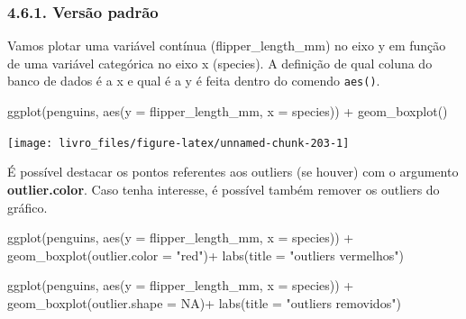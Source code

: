 \documentclass[
]{book}
\newenvironment{Shaded}{\begin{snugshade}}{\end{snugshade}}
\newcommand{\AttributeTok}[1]{\textcolor[rgb]{0.61,0.61,0.61}{#1}}
\newcommand{\ConstantTok}[1]{\textcolor[rgb]{0,0,0}{#1}}
\newcommand{\FunctionTok}[1]{\textcolor[rgb]{0,0,0}{#1}}
\newcommand{\NormalTok}[1]{#1}
\newcommand{\SpecialCharTok}[1]{\textcolor[rgb]{0,0,0}{#1}}
\newcommand{\StringTok}[1]{\textcolor[rgb]{0.5,0.5,0.5}{#1}}
\begin{document}
\hypertarget{versuxe3o-padruxe3o-4}{%
\subsubsection{4.6.1. Versão padrão}\label{versuxe3o-padruxe3o-4}}

Vamos plotar uma variável contínua (flipper\_length\_mm) no eixo y em função de uma variável categórica no eixo x (species). A definição de qual coluna do banco de dados é a x e qual é a y é feita dentro do comendo \texttt{aes()}.

\begin{Shaded}
\begin{Highlighting}[]

\FunctionTok{ggplot}\NormalTok{(penguins, }\FunctionTok{aes}\NormalTok{(}\AttributeTok{y =}\NormalTok{ flipper\_length\_mm, }\AttributeTok{x =}\NormalTok{ species)) }\SpecialCharTok{+}
  \FunctionTok{geom\_boxplot}\NormalTok{()}
\end{Highlighting}
\end{Shaded}

\begin{center}\texttt{[image: livro\_files/figure-latex/unnamed-chunk-203-1]} \end{center}

É possível destacar os pontos referentes aos outliers (se houver) com o argumento \textbf{outlier.color}. Caso tenha interesse, é possível também remover os outliers do gráfico.

\begin{Shaded}
\begin{Highlighting}[]

\FunctionTok{ggplot}\NormalTok{(penguins, }\FunctionTok{aes}\NormalTok{(}\AttributeTok{y =}\NormalTok{ flipper\_length\_mm, }\AttributeTok{x =}\NormalTok{ species)) }\SpecialCharTok{+}
  \FunctionTok{geom\_boxplot}\NormalTok{(}\AttributeTok{outlier.color =} \StringTok{"red"}\NormalTok{)}\SpecialCharTok{+}
  \FunctionTok{labs}\NormalTok{(}\AttributeTok{title =} \StringTok{"outliers vermelhos"}\NormalTok{)}

\FunctionTok{ggplot}\NormalTok{(penguins, }\FunctionTok{aes}\NormalTok{(}\AttributeTok{y =}\NormalTok{ flipper\_length\_mm, }\AttributeTok{x =}\NormalTok{ species)) }\SpecialCharTok{+}
  \FunctionTok{geom\_boxplot}\NormalTok{(}\AttributeTok{outlier.shape =} \ConstantTok{NA}\NormalTok{)}\SpecialCharTok{+}
  \FunctionTok{labs}\NormalTok{(}\AttributeTok{title =} \StringTok{"outliers removidos"}\NormalTok{)}
\end{Highlighting}
\end{Shaded}
\end{document}
